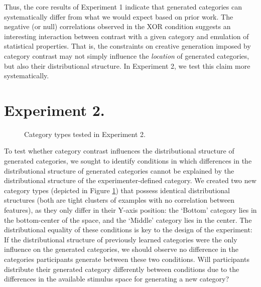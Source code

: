 \documentclass[12pt]{article}
\begin{document}
\begin{flushleft}
Thus, the core results of Experiment 1 indicate that generated categories can
systematically differ from what we would expect based on prior work. The
negative (or null) correlations observed in the XOR condition suggests an
interesting interaction between contrast with a given category and emulation of
statistical properties. That is, the constraints on creative generation imposed
by category contrast may not simply influence the {\em location} of generated
categories, but also their distributional structure. In Experiment 2, we test
this claim more systematically.


\section{Experiment 2.}

\begin{figure}
    \begin{center} 
    \caption{Category types tested in Experiment 2.}
    \label{fig:e2-conditions}
    \end{center}
\end{figure}

To test whether category contrast influences the distributional structure of
generated categories, we sought to identify conditions in which differences in
the distributional structure of generated categories cannot be explained by the
distributional structure of the experimenter-defined category. We created two
new category types (depicted in Figure \ref{fig:e2-conditions}) that possess
identical distributional structures (both are tight clusters of examples with no
correlation between features), as they only differ in their Y-axis position: the
`Bottom' category lies in the bottom-center of the space, and the `Middle'
category lies in the center. The distributional equality of these conditions is
key to the design of the experiment: If the distributional structure of
previously learned categories were the only influence on the generated
categories, we should observe no difference in the categories participants
generate between these two conditions. Will participants distribute their
generated category differently between conditions due to the differences in the
available stimulus space for generating a new category?


\end{flushleft}
\end{document}
